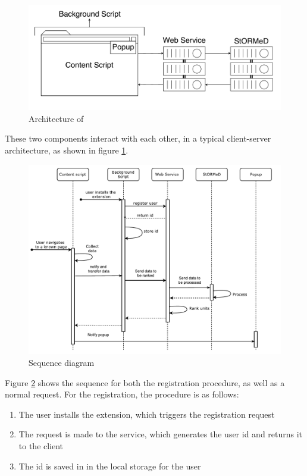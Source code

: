 \begin{figure}[H]
\centering
\includegraphics[scale=0.4]{Figures/ArchitectureNoLabel}
\caption{Architecture of \projectName}
\label{fig:architecture}
\end{figure} 
These two components interact with each other, in a typical client-server architecture, as shown in figure \ref{fig:architecture}.


\begin{figure}[H]
\centering
\includegraphics[scale=0.75]{Figures/SequenceDiagramAll}
\caption{Sequence diagram}
\label{fig:sequenceDiagram}
\end{figure}


Figure \ref{fig:sequenceDiagram} shows the sequence for both the registration procedure, as well as a normal request. For the registration, the procedure is as follows:
\begin{enumerate}
\item The user installs the extension, which triggers the registration request
\item The request is made to the service, which generates the user id and returns it to the client
\item The id is saved in in the local storage for the user
\end{enumerate}

